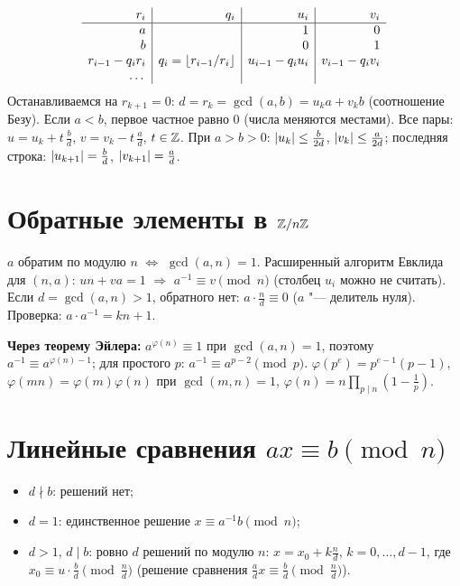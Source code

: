 \documentclass{ca-handout}
\begin{document}
\begin{reminder}[title={Расширенный алгоритм Евклида: $r_i = u_i a + v_i b$}]
\[
  \begin{array}{r|r|r|r}
    r_i & q_i & u_i & v_i \\ \hline
    a & & 1 & 0 \\
    b & & 0 & 1 \\
    r_{i-1} - q_i r_i & q_i = \lfloor r_{i-1}/r_i\rfloor & u_{i-1} - q_i u_i & v_{i-1} - q_i v_i \\
    \dots & & &
  \end{array}
\]
Останавливаемся на $r_{k+1} = 0$: $d = r_k = \gcd(a, b) = u_k a + v_k b$ (соотношение Безу).
Если $a < b$, первое частное равно $0$ (числа меняются местами).
Все пары: $u = u_k + t\,\frac bd$, $v = v_k - t\,\frac ad$, $t \in \mathbb{Z}$. При $a > b > 0$:
$\lvert u_k\rvert \le \frac{b}{2d}$, $\lvert v_k\rvert \le \frac{a}{2d}$; последняя строка: $\lvert u_{k+1}\rvert = \frac bd$,
$\lvert v_{k+1}\rvert = \frac ad$.
\end{reminder}

\section{Обратные элементы в $\mathbb{Z}/n\mathbb{Z}$}
\begin{reminder}[title={Критерий и вычисление}]
$a$ обратим по модулю $n$ $\iff$ $\gcd(a, n) = 1$. Расширенный алгоритм Евклида для $(n, a)$:
$un + va = 1$ $\Rightarrow$ $a^{-1} \equiv v \pmod n$ (столбец $u_i$ можно не считать).
Если $d = \gcd(a, n) > 1$, обратного нет: $a \cdot \frac nd \equiv 0$ ($a$ "--- делитель нуля).
Проверка: $a \cdot a^{-1} = kn + 1$.
\end{reminder}
\textbf{Через теорему Эйлера:} $a^{\varphi(n)} \equiv 1$ при $\gcd(a, n) = 1$, поэтому
$a^{-1} \equiv a^{\varphi(n) - 1}$; для простого $p$: $a^{-1} \equiv a^{p-2} \pmod p$.
$\varphi(p^e) = p^{e-1}(p - 1)$, $\varphi(mn) = \varphi(m)\varphi(n)$ при $\gcd(m, n) = 1$,
$\varphi(n) = n\prod_{p \mid n}(1 - \frac1p)$.

\section{Линейные сравнения $ax \equiv b \pmod n$}
\begin{reminder}[title={$d = \gcd(a, n)$, \ $ua + vn = d$ (расширенный Евклид)}]
\begin{itemize}
  \item $d \nmid b$: решений нет;
  \item $d = 1$: единственное решение $x \equiv a^{-1} b \pmod n$;
  \item $d > 1$, $d \mid b$: ровно $d$ решений по модулю $n$:
    $x = x_0 + k\frac nd$, $k = 0, \dots, d - 1$, где $x_0 \equiv u \cdot \frac bd \pmod{\frac nd}$
    (решение сравнения $\frac ad x \equiv \frac bd \pmod{\frac nd}$).
\end{itemize}
\end{reminder}
\end{document}

